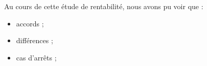 		\begin{leftBarSummary}
			Au cours de cette étude de rentabilité, nous avons pu voir que :
			\begin{itemize}
				\item[\itemko] accords ; %
				\item[\itemok] différences ; %
				\item[\itemok] cas d'arrêts ; %
			\end{itemize}
		\end{leftBarSummary}
		
